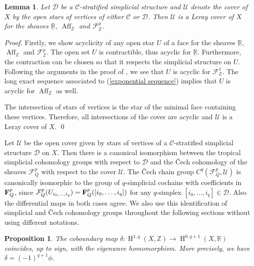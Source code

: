 \documentclass[11pt]{article}
\numberwithin{equation}{numsection}
\newcommand{\Z}{{\mathbb Z}}
\newcommand{\CC}{{\mathcal C}}
\newcommand{\RR}{{\mathbb R}}
\newcommand{\R}{{\mathbb R}}
\newcommand{\FS}{\mathcal{F}}
\newcommand{\DD}{\mathcal{D}}
\DeclareMathOperator{\Aff}{Aff}
\DeclareMathOperator{\HH}{H}
\newtheorem{proposition}[thm]{Proposition}
\newtheorem{lemma}[thm]{Lemma}
\begin{document}
\begin{lemma} \label{lem acyclic}
Let $\DD$ be a $\CC$-stratified simplicial structure and
 $\mathcal{U}$ denote the cover of $X$ by the open stars of vertices of either $\CC$ or $\DD$. 
Then $\mathcal{U}$ is a Leray cover of $X$ for the sheaves $\underline{\R}$, $\Aff_\Z$ and $\FS^{p}_\Z$. 
\end{lemma}
\begin{proof}
Firstly, we show acyclicity of any open star $U$ of a face for the sheaves $\underline{\R}$, $\Aff_\Z$ and $\FS^{p}_\Z$. 
The open set $U$ is contractible, thus acyclic for $\underline{\R}$. 
Furthermore, the contraction can be chosen so that it respects the simplicial structure on $U$. 
Following the arguments in the proof of \cite[Proposition 3.11]{JSS}, we see that $U$ is acyclic for $\FS^1_\Z$. 
The long exact sequence associated to (\ref{exponential sequence}) implies that  $U$ is acyclic for $\Aff_\Z$ as well. 

The intersection of stars of vertices is the star of the minimal face containing these vertices. Therefore, all intersections of the cover are acyclic and 
 $\mathcal{U}$ is a Leray cover of $X$.
 \qed
\end{proof}




\begin{rem} \label{rem:Cech vs simplicial}{\rm
Let $\mathcal{U}$ be the open cover given by stars of vertices of a $\CC$-stratified simplicial structure $\DD$ on $X$. 
Then there is a canonical isomorphism between 
the tropical  simplicial cohomology groups with respect to $\DD$ 
and the \v{C}ech cohomology of the sheaves $\mathcal{F}^p_Q$ with respect to the cover $\mathcal{U}$.
The \v{C}ech chain group $C^q(\FS^p_Q, \mathcal{U})$ 
is canonically isomorphic to 
the group of $q$-simplicial cochains with coefficients in ${\bf F}^p_Q$, 
since $\FS^p_Q(U_{i_0,\dots,i_q}) = {\bf F}^p_Q([i_0,\dots,i_q])$ for any $q$-simplex $[i_0,\dots,i_q] \in \DD$.
Also the differential maps in both cases agree.  We also use this identification of simplicial and \v{C}ech cohomology groups throughout the following sections  without using  different notations.}
\end{rem}




\begin{proposition} \label{boundary and wave}
The coboundary map 
$\delta \colon \HH^{1,q}(X, \Z) \to \HH^{0, q+1}(X,\RR)$ 
coincides, up to sign, with the  eigenwave  homomorphism. More precisely, we have 
$
  \delta = (-1)^{q+1} \phi.
$
\end{proposition}
\end{document}
